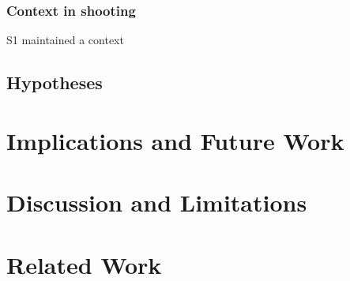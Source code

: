 \subsubsection{Context in shooting} S1 maintained a context 
\subsection{Hypotheses}

\section{Implications and Future Work}

\section{Discussion and Limitations}

\section{Related Work}
